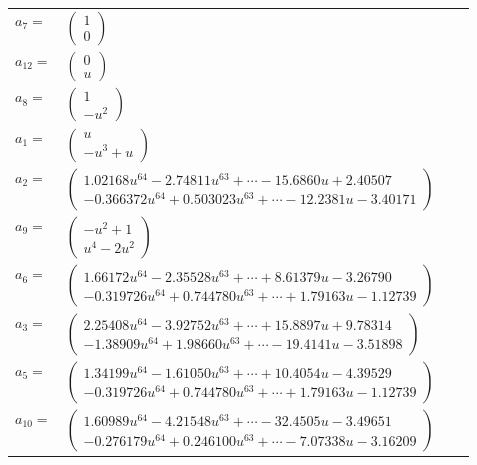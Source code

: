 \documentclass[1p]{elsarticle_modified}
\theoremstyle{definition}
\begin{document}
\begin{tabular}{m{7pt} m{180pt} m{7pt} m{180pt} }
\flushright $a_{7}=$&$\begin{pmatrix}1\\0\end{pmatrix}$ \\
\flushright $a_{12}=$&$\begin{pmatrix}0\\u\end{pmatrix}$ \\
\flushright $a_{8}=$&$\begin{pmatrix}1\\- u^2\end{pmatrix}$ \\
\flushright $a_{1}=$&$\begin{pmatrix}u\\- u^3+u\end{pmatrix}$ \\
\flushright $a_{2}=$&$\begin{pmatrix}1.02168 u^{64}-2.74811 u^{63}+\cdots-15.6860 u+2.40507\\-0.366372 u^{64}+0.503023 u^{63}+\cdots-12.2381 u-3.40171\end{pmatrix}$ \\
\flushright $a_{9}=$&$\begin{pmatrix}- u^2+1\\u^4-2 u^2\end{pmatrix}$ \\
\flushright $a_{6}=$&$\begin{pmatrix}1.66172 u^{64}-2.35528 u^{63}+\cdots+8.61379 u-3.26790\\-0.319726 u^{64}+0.744780 u^{63}+\cdots+1.79163 u-1.12739\end{pmatrix}$ \\
\flushright $a_{3}=$&$\begin{pmatrix}2.25408 u^{64}-3.92752 u^{63}+\cdots+15.8897 u+9.78314\\-1.38909 u^{64}+1.98660 u^{63}+\cdots-19.4141 u-3.51898\end{pmatrix}$ \\
\flushright $a_{5}=$&$\begin{pmatrix}1.34199 u^{64}-1.61050 u^{63}+\cdots+10.4054 u-4.39529\\-0.319726 u^{64}+0.744780 u^{63}+\cdots+1.79163 u-1.12739\end{pmatrix}$ \\
\flushright $a_{10}=$&$\begin{pmatrix}1.60989 u^{64}-4.21548 u^{63}+\cdots-32.4505 u-3.49651\\-0.276179 u^{64}+0.246100 u^{63}+\cdots-7.07338 u-3.16209\end{pmatrix}$ \\

\end{tabular}
\end{document}

